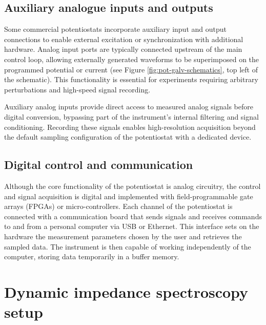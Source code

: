 \subsection{Auxiliary analogue inputs and outputs}

Some commercial potentiostats incorporate auxiliary input and output connections to enable external excitation or synchronization with additional hardware.
Analog input ports are typically connected upstream of the main control loop, allowing externally generated waveforms to be superimposed on the programmed potential or current (see Figure \ref{fig:pot-galv-schematics}, top left of the schematic).
This functionality is essential for experiments requiring arbitrary perturbations and high-speed signal recording.

Auxiliary analog inputs provide direct access to measured analog signals before digital conversion, bypassing part of the instrument's internal filtering and signal conditioning.
Recording these signals enables high-resolution acquisition beyond the default sampling configuration of the potentiostat with a dedicated device.

\subsection{Digital control and communication}

Although the core functionality of the potentiostat is analog circuitry, the control and signal acquisition is digital and implemented with field-programmable gate arrays (FPGAs) or micro-controllers.
Each channel of the potentiostat is connected with a communication board that sends signals and receives commands to and from a personal computer via USB or Ethernet.
This interface sets on the hardware the measurement parameters chosen by the user and retrieves the sampled data.
The instrument is then capable of working independently of the computer, storing data temporarily in a buffer memory.


\section{Dynamic impedance spectroscopy setup}
\label{sec:instrumentation}

